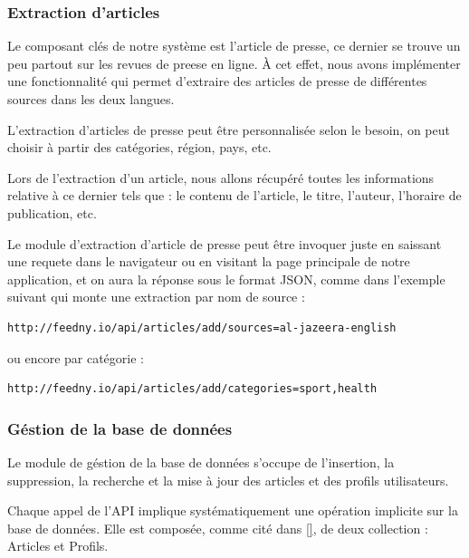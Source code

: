         \subsubsection{Extraction d'articles}
        Le composant clés de notre système est l'article de presse, ce dernier se trouve un peu partout sur les revues de preese en ligne. À cet effet, nous avons implémenter une fonctionnalité qui permet d'extraire des articles de presse de différentes sources dans les deux langues.

        L'extraction d'articles de presse peut être personnalisée selon le besoin, on peut choisir à partir des catégories, région, pays, etc.

        Lors de l'extraction d'un article, nous allons récupéré toutes les informations relative à ce dernier tels que : le contenu de l'article, le titre, l'auteur, l'horaire de publication, etc.

        Le module d'extraction d'article de presse peut être invoquer juste en saissant une requete dans le navigateur ou en visitant la page principale de notre application, et on aura la réponse sous le format JSON, comme dans l'exemple suivant qui monte une extraction par nom de source :

\begin{lstlisting}[style=api] 
  http://feedny.io/api/articles/add/sources=al-jazeera-english
\end{lstlisting}
        
        ou encore par catégorie :
\begin{lstlisting}[style=api] 
  http://feedny.io/api/articles/add/categories=sport,health
\end{lstlisting}  

        \subsubsection{Géstion de la base de données}
        Le module de géstion de la base de données s'occupe de l'insertion, la suppression, la recherche et la mise à jour des articles et des profils utilisateurs.

        Chaque appel de l'API implique systématiquement une opération implicite sur la base de données. Elle est composée, comme cité dans \autoref{}, de deux collection : Articles et Profils. 

